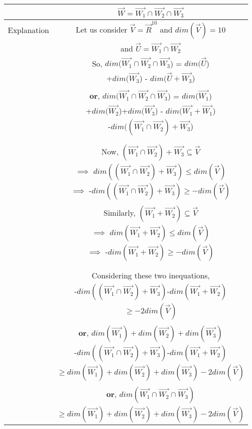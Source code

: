\begin{longtable}{|c|c|}
& $\vec{W} = \vec{W_1} \cap \vec{W_2} \cap \vec{W_3}$ \\
\hline
Explanation & Let us consider $\vec{V}=\vec{R}^{10}$ and $dim(\vec{V})=10$\\
& and $\vec{U} = \vec{W_1} \cap \vec{W_2}$\\
& So, $dim(\vec{W_1} \cap \vec{W_2} \cap \vec{W_3}$) = $dim(\vec{U}$)\\
& +$dim(\vec{W_3}$) - $dim(\vec{U}+\vec{W_3}$)\\
& \\
& $\textbf{or,}$ $dim(\vec{W_1} \cap \vec{W_2} \cap \vec{W_3}$) = $dim(\vec{W_1}$)\\
& +$dim(\vec{W_2}$)+$dim(\vec{W_3}$) - $dim(\vec{W_1}+\vec{W_1}$)\\
& -$dim((\vec{W_1} \cap \vec{W_2})+\vec{W_3}$)\\
& \\
\hline
& \\
& Now, $(\vec{W_1} \cap \vec{W_2})+\vec{W_3} \subseteq \vec{V}$\\
& $\implies$ $dim((\vec{W_1} \cap \vec{W_2})+\vec{W_3})\leq dim(\vec{V})$\\
& $\implies$ -$dim((\vec{W_1} \cap \vec{W_2})+\vec{W_3})\geq -dim(\vec{V})$\\
& \\
& Similarly, $(\vec{W_1}+\vec{W_2})\subseteq \vec{V}$\\
& $\implies$ $dim(\vec{W_1}+\vec{W_2})\leq dim(\vec{V})$\\
& $\implies$ -$dim(\vec{W_1}+\vec{W_2})\geq -dim(\vec{V})$\\
& \\
\hline
& \\
& Considering these two inequations,\\
& -$dim((\vec{W_1} \cap \vec{W_2})+\vec{W_3})$-$dim(\vec{W_1}+\vec{W_2})$\\
& $\geq -2dim(\vec{V})$\\
& \\
& $\textbf{or,}$  $dim(\vec{W_1})+dim(\vec{W_2})+dim(\vec{W_3})$\\
& -$dim((\vec{W_1} \cap \vec{W_2})+\vec{W_3})$-$dim(\vec{W_1}+\vec{W_2})$\\
& $\geq dim(\vec{W_1})+dim(\vec{W_2})+dim(\vec{W_3})-2dim(\vec{V})$\\
& \\
& $\textbf{or,}$ $dim(\vec{W_1} \cap \vec{W_2} \cap \vec{W_3})$\\
& $\geq dim(\vec{W_1})+dim(\vec{W_2})+dim(\vec{W_3})-2dim(\vec{V})$\\

\end{longtable}
